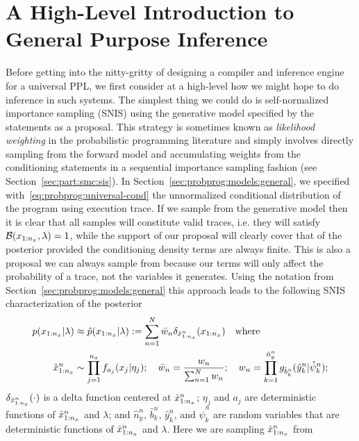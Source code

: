 
\section{A High-Level Introduction to General Purpose Inference}
\label{sec:proginf:high}

Before getting into the nitty-gritty of designing a compiler and inference engine for a universal PPL, we
first consider at a high-level how we might hope to do inference in such systems.  The simplest
thing we could do is self-normalized importance sampling (SNIS) using the generative model specified by the \sample
statements as a proposal.  This strategy is sometimes known as \emph{likelihood weighting} in the probabilistic
programming literature and simply involves directly sampling from the forward model and accumulating
weights from the \observe conditioning statements in a sequential importance sampling fashion (see 
Section~\ref{sec:part:smc:sis}).
In Section~\ref{sec:probprog:models:general}, we specified with~\eqref{eq:probprog:universal-cond}
the unnormalized conditional distribution of the program using execution trace.  
If we sample from the generative model then it is clear that all samples will constitute valid
traces, i.e. they will satisfy
$\mathcal{B}(x_{1:n_x},\lambda)=1$, while  the support of our proposal will clearly cover that of
the posterior provided the conditioning density terms are always finite.  This is also a proposal
we can always sample from because our \observe terms will only affect the probability of a trace, not
the variables it generates.  Using the notation from Section~\ref{sec:probprog:models:general} 
this approach leads to the following SNIS characterization of the posterior
\begin{align}
p(x_{1:n_x} | \lambda) &\approx \hat{p}(x_{1:n_x} | \lambda) := \sum_{n=1}^{N} \bar w_n \delta_{\hat{x}_{1:n_x}^n} (x_{1:n_x})
\quad \text{where}  \\
\hat{x}_{1:n_x}^n &\sim \prod_{j=1}^{n_x} f_{a_j}(x_j | \eta_j); \quad \bar w_n = \frac{w_n}{\sum_{n=1}^{N} w_n}; \quad
w_n = \prod_{k=1}^{\hat{n}_{y}^n} g_{\hat{b}_{k}^n}(\hat{y}_{k}^n | \hat{\psi}_{k}^n);
\end{align}
$\delta_{\hat{x}_{1:n_x}^n} (\cdot)$ is a delta function centered at $\hat{x}_{1:n_x}^n$; $\eta_j$ and $a_j$ are deterministic functions of $\hat{x}_{1:n_x}^n$ 
and $\lambda$; and $\hat{n}_{y}^n$, $\hat{b}_{k}^n$, $\hat{y}_{k}^n$, and $\hat{\psi}_{k}^n$ are random variables
that are deterministic functions of $\hat{x}_{1:n_x}^n$ and $\lambda$.  Here we are sampling $\hat{x}_{1:n_x}^n$ from
